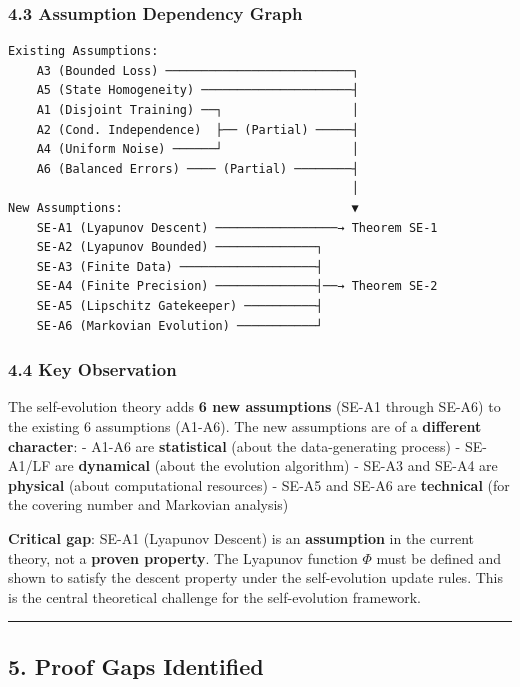 \documentclass[
  12pt,
]{article}
\begin{document}
\subsubsection{4.3 Assumption Dependency
Graph}\label{assumption-dependency-graph}

\begin{verbatim}
Existing Assumptions:
    A3 (Bounded Loss) ──────────────────────────┐
    A5 (State Homogeneity) ─────────────────────┤
    A1 (Disjoint Training) ──┐                  │
    A2 (Cond. Independence)  ├── (Partial) ─────┤
    A4 (Uniform Noise) ──────┘                  │
    A6 (Balanced Errors) ──── (Partial) ────────┤
                                                │
New Assumptions:                                ▼
    SE-A1 (Lyapunov Descent) ─────────────────→ Theorem SE-1
    SE-A2 (Lyapunov Bounded) ──────────────┐
    SE-A3 (Finite Data) ───────────────────┤
    SE-A4 (Finite Precision) ──────────────┤──→ Theorem SE-2
    SE-A5 (Lipschitz Gatekeeper) ──────────┤
    SE-A6 (Markovian Evolution) ───────────┘
\end{verbatim}

\subsubsection{4.4 Key Observation}\label{key-observation}

The self-evolution theory adds \textbf{6 new assumptions} (SE-A1 through
SE-A6) to the existing 6 assumptions (A1-A6). The new assumptions are of
a \textbf{different character}: - A1-A6 are \textbf{statistical} (about
the data-generating process) - SE-A1/LF are \textbf{dynamical} (about
the evolution algorithm) - SE-A3 and SE-A4 are \textbf{physical} (about
computational resources) - SE-A5 and SE-A6 are \textbf{technical} (for
the covering number and Markovian analysis)

\textbf{Critical gap}: SE-A1 (Lyapunov Descent) is an
\textbf{assumption} in the current theory, not a \textbf{proven
property}. The Lyapunov function \(\Phi\) must be defined and shown to
satisfy the descent property under the self-evolution update rules. This
is the central theoretical challenge for the self-evolution framework.

\begin{center}\rule{0.5\linewidth}{0.5pt}\end{center}

\subsection{5. Proof Gaps Identified}\label{proof-gaps-identified}
\end{document}

